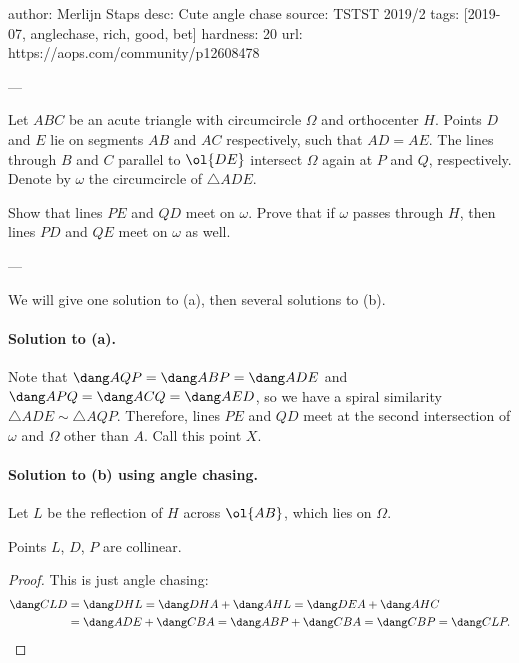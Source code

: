 author: Merlijn Staps
desc: Cute angle chase
source: TSTST 2019/2
tags: [2019-07, anglechase, rich, good, bet]
hardness: 20
url: https://aops.com/community/p12608478

---

Let $ABC$ be an acute triangle with circumcircle $\Omega$
and orthocenter $H$.
Points $D$ and $E$ lie on segments $AB$ and $AC$
respectively, such that $AD = AE$.
The lines through $B$ and $C$ parallel to $\ol{DE}$
intersect $\Omega$ again at $P$ and $Q$, respectively.
Denote by $\omega$ the circumcircle of $\triangle ADE$.
\begin{enumerate}[(a)]
  \ii Show that lines $PE$ and $QD$ meet on $\omega$.
  \ii Prove that if $\omega$ passes through $H$,
  then lines $PD$ and $QE$ meet on $\omega$ as well.
\end{enumerate}

---

We will give one solution to (a),
then several solutions to (b).

\paragraph{Solution to (a).}
Note that $\dang AQP = \dang ABP = \dang ADE$
and $\dang APQ = \dang ACQ = \dang AED$,
so we have a spiral similarity $\triangle ADE \sim \triangle AQP$.
Therefore, lines $PE$ and $QD$ meet at the second
intersection of $\omega$ and $\Omega$ other than $A$.
Call this point $X$.

\paragraph{Solution to (b) using angle chasing.}
Let $L$ be the reflection of $H$ across $\ol{AB}$,
which lies on $\Omega$.
\begin{claim*}
  Points $L$, $D$, $P$ are collinear.
\end{claim*}
\begin{proof}
  This is just angle chasing:
  \begin{align*}
    \dang CLD &= \dang DHL
    = \dang DHA + \dang AHL = \dang DEA + \dang AHC \\
    &= \dang ADE + \dang CBA = \dang ABP + \dang CBA
    = \dang CBP = \dang CLP. \qedhere
  \end{align*}
\end{proof}

